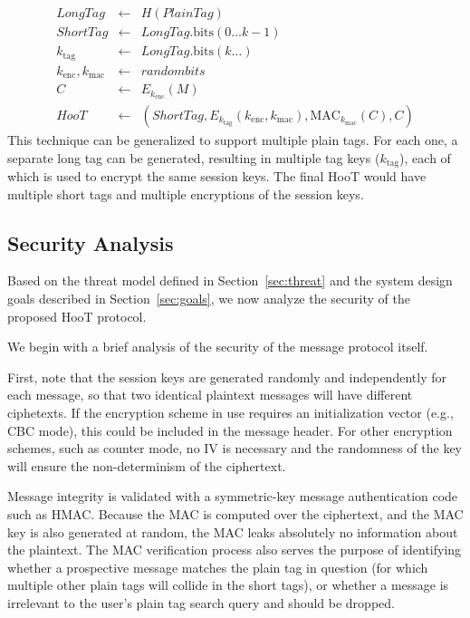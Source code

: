 \begin{eqnarray*}
\mathit{LongTag} & \leftarrow & H(\mathit{PlainTag}) \\
\mathit{ShortTag} & \leftarrow & \mathit{LongTag}.\mathrm{bits}(0 \ldots k-1) \\
k_{\mathrm{tag}} & \leftarrow & \mathit{LongTag}.\mathrm{bits}(k \ldots) \\
k_{\mathrm{enc}}, k_{\mathrm{mac}} & \leftarrow & \mathit{random bits} \\
C & \leftarrow & E_{k_{\mathrm{enc}}}(M) \\
\mathit{HooT}  & \leftarrow &  \left(\mathit{ShortTag}, E_{k_{\mathrm{tag}}} \left(k_{\mathrm{enc}}, k_{\mathrm{mac}}\right), \mathrm{MAC}_{k_{\mathrm{mac}}}(C), C\right)
\end{eqnarray*}
%
This technique can be generalized to support multiple plain tags. For
each one, a separate long tag can be generated, resulting in multiple
tag keys ($k_\mathrm{tag}$), each of which is used to encrypt the same
session keys. The final HooT would have multiple short tags and multiple
encryptions of the session keys.


\subsection{Security Analysis}
\label{sec:security}

Based on the threat model defined in Section~\ref{sec:threat} and the
system design goals described in Section~\ref{sec:goals}, we now analyze
the security of the proposed HooT protocol.

%
We begin with a brief analysis of the security of the message protocol
itself.

First, note that the session keys are generated randomly and
independently for each message, so that two identical plaintext messages
will have different ciphetexts. If the encryption scheme in use requires
an initialization vector (e.g., CBC mode), this could be included in the
message header. For other encryption schemes, such as counter mode, no
IV is necessary and the randomness of the key will ensure the
non-determinism of the ciphertext.

Message integrity is validated with a symmetric-key message
authentication code such as HMAC. Because the MAC is computed over the
ciphertext, and the MAC key is also generated at random, the MAC leaks
absolutely no information about the plaintext. The MAC verification
process also serves the purpose of identifying whether a prospective
message matches the plain tag in question (for which multiple other
plain tags will collide in the short tags), or whether a message is
irrelevant to the user's plain tag search query and should be dropped.

